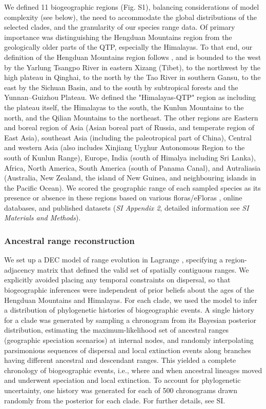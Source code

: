 We defined 11 biogeographic regions (Fig. S1), balancing considerations of model complexity (see below), the need to accommodate the global distributions of the selected clades, and the granularity of our species range data. Of primary importance was distinguishing the Hengduan Mountains region from the geologically older parts of the QTP, especially the Himalayas. To that end, our definition of the Hengduan Mountains region follows \citet{Boufford2014}, and is bounded to the west by the Yarlung Tsangpo River in eastern Xizang (Tibet), to the northwest by the high plateau in Qinghai, to the north by the Tao River in southern Gansu, to the east by the Sichuan Basin, and to the south by subtropical forests and the Yunnan–Guizhou Plateau. We defined the "Himalayas-QTP" region as including the plateau itself, the Himalayas to the south, the Kunlun Mountains to the north, and the Qilian Mountains to the northeast. The other regions are Eastern and boreal region of Asia (Asian boreal part of Russia, and temperate region of East Asia), southeast Asia (including the paleotropical part of China), Central and western Asia (also includes Xinjiang Uyghur Autonomous Region to the south of Kunlun Range), Europe, India (south of Himalya including Sri Lanka), Africa, North America, South America (south of Panama Canal), and Autraliasia (Australia, New Zealand, the island of New Guinea, and neighbouring islands in the Pacific Ocean). We scored the geographic range of each sampled species as its presence or absence in these regions based on various floras/eFloras , online databases, and published datasets (\textit{SI Appendix 2}, detailed information see \textit{SI Materials and Methods}). 

\subsubsection{Ancestral range reconstruction}

We set up a DEC model of range evolution in Lagrange \citep{Ree2005,Ree2008}, specifying a region-adjacency matrix that defined the valid set of spatially contiguous ranges. We explicitly avoided placing any temporal constraints on dispersal, so that biogeographic inferences were independent of prior beliefs about the ages of the Hengduan Mountains and Himalayas. For each clade, we used the model to infer a distribution of phylogenetic histories of biogeographic events. A single history for a clade was generated by sampling a chronogram from its Bayesian posterior distribution, estimating the maximum-likelihood set of ancestral ranges (geographic speciation scenarios) at internal nodes, and randomly interpolating parsimonious sequences of dispersal and local extinction events along branches having different ancestral and descendant ranges. This yielded a complete chronology of biogeographic events, i.e., where and when ancestral lineages moved and underwent speciation and local extinction. To account for phylogenetic uncertainty, one history was generated for each of 500 chronograms drawn randomly from the posterior for each clade. For further details, see SI.

